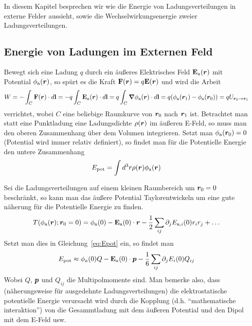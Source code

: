 In diesem Kapitel besprechen wir wie die Energie von Ladungsverteilungen 
in externe Felder aussieht, sowie die Wechselwirkungsenergie zweier
Ladungsverteilungen.

\subsection{Energie von Ladungen im Externen Feld}%
Bewegt sich eine Ladung $q$ 
durch ein äußeres Elektrisches Feld $\vb E_{\mathrm{a}}(\vb*r)$ mit
Potential $\phi_{\mathrm{a}}(\vb*r)$, so spürt es die Kraft $\vb F(\vb*r)=q\vb E(\vb*r)$ und wird
die Arbeit
\begin{equation*}
  W 
  = -\int_C \vb F(\vb*r) \cdot d\vb l 
  = -q\int_C \vb E_{\mathrm{a}}(\vb*r) \cdot d\vb l 
  = q\int_{C} \grad\phi_{\mathrm{a}}(\vb*r) \cdot d\vb l 
  = q(\phi_{\mathrm{a}}(\vb*r_1)-\phi_{\mathrm{a}}(\vb*r_0))
  = qU_{\vb*r_0\to\vb*r_1}
\end{equation*}
verrichtet, wobei $C$ eine beliebige Raumkurve von $\vb*r_0$ nach $\vb*r_1$ ist.
Betrachtet man statt eine Punktladung eine Ladungsdichte $\rho(\vb*r)$ im
äußeren E-Feld, so muss man den oberen Zusammenhang über dem Volumen
integrieren. Setzt man $\phi_{\mathrm a}(\vb*r_0)=0$ (Potential
wird immer relativ definiert), so findet man für
die Potentielle Energie den untere Zusammenhang
\begin{equation}
  \label{eq:Epot}
  E_{\mathrm{pot}}=\int d^3r \rho(\vb*r)\phi_{\mathrm{a}}(\vb*r)
\end{equation}

Sei die Ladungsverteilungen auf einem kleinen Raumbereich um $\vb*r_0=0$ 
beschränkt, so kann man das äußere Potential Taylorentwickeln um eine
gute näherung für die Potentielle Energie zu finden.
\begin{equation*}
  T(\phi_{\mathrm{a}}(\vb*r); \vb*r_0=0) = 
  \phi_{\mathrm{a}}(0) 
  - \vb E_{\mathrm{a}}(0)\cdot\vb*r 
  - \frac{1}{2} \sum_{ij} \partial_{j} {E_{\mathrm{a},i}}(0)r_ir_j
  + \ldots
\end{equation*}
Setzt man dies in Gleichung~\ref{eq:Epot} ein, so findet man
\begin{equation}
  E_{\mathrm{pot}}\approx 
  \phi_{a}(0)Q 
  - \vb E_{a}(0) \cdot \vb*p
  - \frac{1}{6} \sum_{ij} \partial_{j} E_i(0)Q_{ij}
\end{equation}
Wobei $Q$, $\vb*p$ und $Q_{ij}$ die Multipolmomente sind. Man bemerke also,
dass (näherungsweise für ausgedehnte Ladungsverteilungen) die 
elektrostatische potentielle Energie verursacht wird durch die Kopplung
(d.h. ``mathematische interaktion'') von die Gesammtladung mit dem äußeren 
Potential und den Dipol mit dem E-Feld usw.

